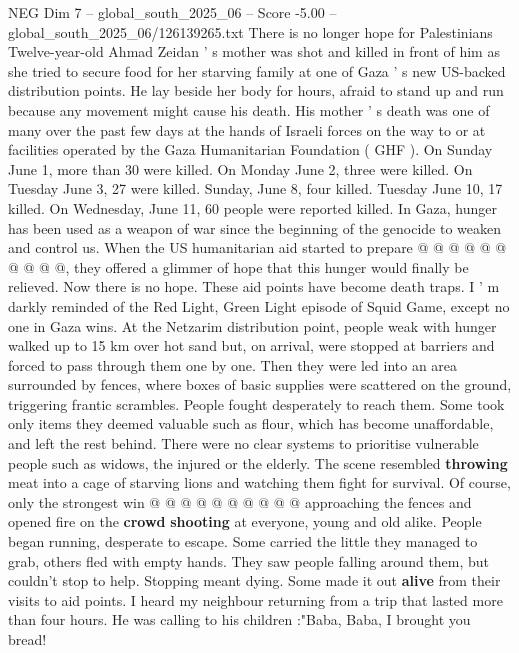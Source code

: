 \begin{textsample}{NEG Dim 7 – global\_south\_2025\_06 – Score -5.00 – global\_south\_2025\_06/126139265.txt}  \label{ex:f7_neg_273}
There is no longer hope for Palestinians Twelve-year-old Ahmad Zeidan ' s mother was shot and killed in front of him as she tried to secure food for her starving family at one of Gaza ' s new US-backed distribution points.
He lay beside her body for hours, afraid to stand up and run because any movement might cause his death.
His mother ' s death was one of many over the past few days at the hands of Israeli forces on the way to or at facilities operated by the Gaza Humanitarian Foundation ( GHF ).
On Sunday June 1, more than 30 were killed.
On Monday June 2, three were killed.
On Tuesday June 3, 27 were killed.
Sunday, June 8, four killed.
Tuesday June 10, 17 killed.
On Wednesday, June 11, 60 people were reported killed.
In Gaza, hunger has been used as a weapon of war since the beginning of the genocide to weaken and control us.
When the US humanitarian aid started to prepare @ @ @ @ @ @ @ @ @ @, they offered a glimmer of hope that this hunger would finally be relieved.
Now there is no hope.
These aid points have become death traps.
I ' m darkly reminded of the Red Light, Green Light episode of Squid Game, except no one in Gaza wins.
At the Netzarim distribution point, people weak with hunger walked up to 15 km over hot sand but, on arrival, were stopped at barriers and forced to pass through them one by one.
Then they were led into an area surrounded by fences, where boxes of basic supplies were scattered on the ground, triggering frantic scrambles.
People fought desperately to reach them.
Some took only items they deemed valuable such as flour, which has become unaffordable, and left the rest behind.
There were no clear systems to prioritise vulnerable people such as widows, the injured or the elderly.
The scene resembled \textbf{throwing} meat into a cage of starving lions and watching them fight for survival.
Of course, only the strongest win @ @ @ @ @ @ @ @ @ @ approaching the fences and opened fire on the \textbf{crowd} \textbf{shooting} at everyone, young and old alike.
People began running, desperate to escape.
Some carried the little they managed to grab, others fled with empty hands.
They saw people falling around them, but couldn't stop to help.
Stopping meant dying.
Some made it out \textbf{alive} from their visits to aid points.
I heard my neighbour returning from a trip that lasted more than four hours.
He was calling to his children :"Baba, Baba, I brought you bread!

\end{textsample}
